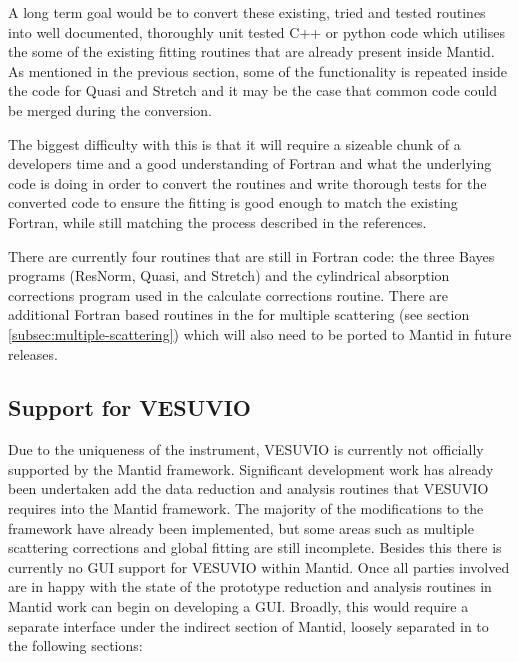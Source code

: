 \documentclass[paper=a4, fontsize=11pt]{scrartcl}	%
\numberwithin{equation}{section}															%
\numberwithin{figure}{section}																%
\numberwithin{table}{section}																%
\begin{document}
A long term goal would be to convert these existing, tried and tested routines into well documented, thoroughly unit tested C++ or python code which utilises the some of the existing fitting routines that are already present inside Mantid. As mentioned in the previous section, some of the functionality is repeated inside the code for Quasi and Stretch and it may be the case that common code could be merged during the conversion.

The biggest difficulty with this is that it will require a sizeable chunk of a developers time and a good understanding of Fortran and what the underlying code is doing in order to convert the routines and write thorough tests for the converted code to ensure the fitting is good enough to match the existing Fortran, while still matching the process described in the references.

There are currently four routines that are still in Fortran code: the three Bayes programs (ResNorm, Quasi, and Stretch) and the cylindrical absorption corrections program used in the calculate corrections routine. There are additional Fortran based routines in the for multiple scattering (see section \ref{subsec:multiple-scattering}) which will also need to be ported to Mantid in future releases.

\subsection{Support for VESUVIO}
Due to the uniqueness of the instrument, VESUVIO is currently not officially supported by the Mantid framework. Significant development work has already been undertaken add the data reduction and analysis routines that VESUVIO requires into the Mantid framework. The majority of the modifications to the framework have already been implemented, but some areas such as multiple scattering corrections \cite{mayers2002multiple} and global fitting are still incomplete. Besides this there is currently no GUI support for VESUVIO within Mantid. Once all parties involved are in happy with the state of the prototype reduction and analysis routines in Mantid work can begin on developing a GUI. Broadly, this would require a separate interface under the indirect section of Mantid, loosely separated in to the following sections:
\end{document}
